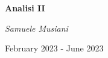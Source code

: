 \thispagestyle{empty}

\begin{center}
	\vfill
    \vspace*{0.3\textheight}

	\Huge
	\textbf{Analisi II}
	
	\vspace{1cm}
	
	\Large
	\textit{Samuele Musiani}
	
	\vspace{3cm}
	
	\large
	February 2023 - June 2023
	
    \normalsize
    
\end{center}
